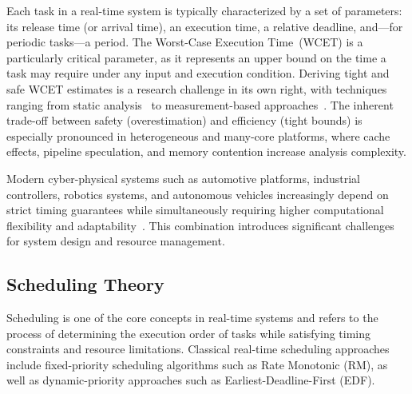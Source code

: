 Each task in a real-time system is typically characterized by
a set of parameters: its release time (or arrival time), an
execution time, a relative deadline, and---for periodic
tasks---a period. The Worst-Case Execution Time~(WCET) is a
particularly critical parameter, as it represents an upper
bound on the time a task may require under any input and
execution condition. Deriving tight and safe WCET estimates
is a research challenge in its own right, with techniques
ranging from static analysis~\cite{wilhelm2008} to
measurement-based approaches~\cite{engblom2002}. The
inherent trade-off between safety (overestimation) and
efficiency (tight bounds) is especially pronounced in
heterogeneous and many-core platforms, where cache effects,
pipeline speculation, and memory contention increase
analysis complexity.

Modern cyber-physical systems such as automotive platforms,
industrial controllers, robotics systems, and autonomous
vehicles increasingly depend on strict timing guarantees while
simultaneously requiring higher computational flexibility and
adaptability~\cite{baunach2018,autosar_ap2023,pan2024sdv}. %
This combination
introduces significant challenges for system design and
resource management.

\subsection{Scheduling Theory}
\label{subsec:scheduling}

Scheduling is one of the core concepts in real-time systems
and refers to the process of determining the execution order
of tasks while satisfying timing constraints and resource
limitations. Classical real-time scheduling approaches include
fixed-priority scheduling algorithms such as Rate Monotonic
(RM), as well as dynamic-priority approaches such as
Earliest-Deadline-First (EDF).

